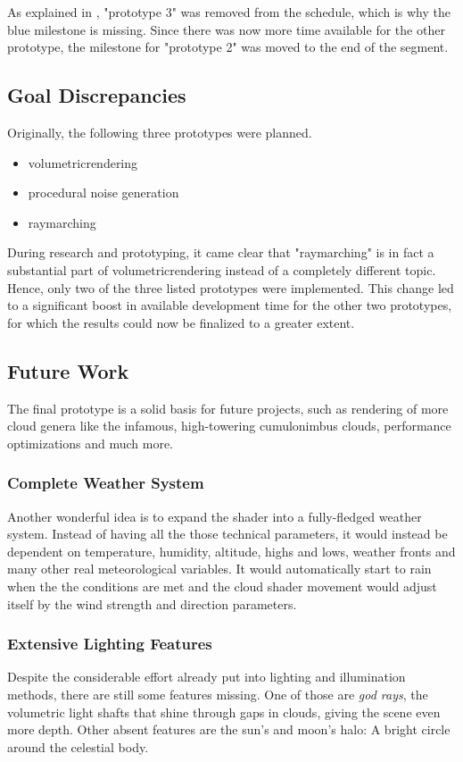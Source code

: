 \vspace{\baselineskip}
\noindent
As explained in , "prototype 3" was removed from the schedule, which is why the blue milestone is missing.
Since there was now more time available for the other prototype, the milestone for "prototype 2" was moved to the end of the segment.

\subsection{Goal Discrepancies}
\label{section:projectmanagement:goals}
Originally, the following three prototypes were planned.
\begin{itemize}
    \item \gls{volumetricrendering}
    \item \gls{procedural} \gls{noise} generation
    \item \gls{raymarching}
\end{itemize}
During research and prototyping, it came clear that "\gls{raymarching}" is in fact a substantial part of \gls{volumetricrendering} instead of a completely different topic.
Hence, only two of the three listed prototypes were implemented. This change led to a significant boost in available development time for the other two prototypes, for which the results could now be finalized to a greater extent.

\subsection{Future Work}
The final prototype is a solid basis for future projects, such as rendering of more cloud genera like the infamous, high-towering cumulonimbus clouds, performance optimizations and much more.

\subsubsection{Complete Weather System}
Another wonderful idea is to expand the shader into a fully-fledged weather system. Instead of having all the those technical \gls{parameters}, it would instead be dependent on temperature, humidity, altitude, highs and lows, weather fronts and many other real meteorological variables.
It would automatically start to rain when the the conditions are met and the cloud shader movement would adjust itself by the wind strength and direction \gls{parameters}.

\subsubsection{Extensive Lighting Features}
Despite the considerable effort already put into lighting and illumination methods, there are still some features missing. One of those are \textit{god rays}, the volumetric light shafts that shine through gaps in clouds, giving the scene even more depth.
Other absent features are the sun's and moon's halo: A bright circle around the celestial body.

